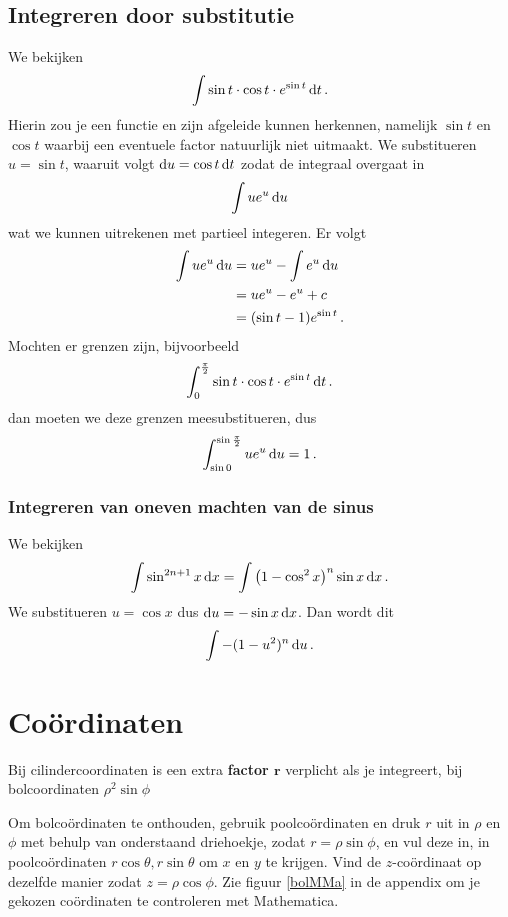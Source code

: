 \documentclass{article}
\begin{document}
        \subsection{Integreren door substitutie}
            We bekijken
            \[ \int \sin t \cdot \cos t \cdot e^{\sin t} \mathop{}\!\mathrm{d} t\,. \]
            Hierin zou je een functie en zijn afgeleide kunnen herkennen, namelijk
            $\sin t$ en $\cos t$ waarbij een eventuele factor natuurlijk niet uitmaakt.
            We substitueren $u = \sin t$, waaruit volgt $\mathop{}\!\mathrm{d} u = \cos t \mathop{}\!\mathrm{d} t$
            zodat de integraal overgaat in
            \[ \int u e^u \mathop{}\!\mathrm{d} u \]
            wat we kunnen uitrekenen met partieel integeren. Er volgt
            \begin{align*}
                \int u e^u \mathop{}\!\mathrm{d} u &= u e^u - \int e^u \mathop{}\!\mathrm{d} u \\
                &=  u e^u -  e^u + c \\
                &= (\sin t -1) e^{\sin t} \,.
            \end{align*}
            Mochten er grenzen zijn, bijvoorbeeld
            \[ \int_0^{\frac{\pi}{2}} \sin t \cdot \cos t \cdot e^{\sin t} \mathop{}\!\mathrm{d} t\,. \]
            dan moeten we deze grenzen meesubstitueren, dus
            \[ \int_{\sin 0}^{\sin \frac{\pi}{2}} u e^u \mathop{}\!\mathrm{d} u = 1\,. \]

			\subsubsection{Integreren van oneven machten van de sinus}
				We bekijken
				\begin{align*}
					\int \sin^{2n+1} x \mathop{}\!\mathrm{d} x = \int \left( 1-\cos^2 x \right)^n \sin x \mathop{}\!\mathrm{d} x \,.
				\end{align*}
				We substitueren $u=\cos x$ dus $\mathop{}\!\mathrm{d} u = - \sin x \mathop{}\!\mathrm{d} x$. Dan wordt dit
				\begin{align*}
					\int -(1-u^2)^n \mathop{}\!\mathrm{d} u\,.
				\end{align*}

	 \section{Co\"ordinaten}
		 Bij cilindercoordinaten is een extra \textbf{factor $\bm r$} verplicht als je integreert, bij bolcoordinaten $\rho^2 \sin \phi$
		 
		 Om bolco\"ordinaten te onthouden, gebruik poolco\"ordinaten en druk $r$ uit in $\rho$ en $\phi$ met behulp van onderstaand driehoekje, zodat $r=\rho \sin \phi$, en vul deze in, in poolco\"ordinaten $r \cos \theta,r \sin \theta$ om $x$ en $y$ te krijgen. Vind de $z$-co\"ordinaat op dezelfde manier zodat $z=\rho \cos \phi$. Zie figuur \ref{bolMMa} in de appendix om je gekozen co\"ordinaten te controleren met Mathematica.
		 					
\end{document}
